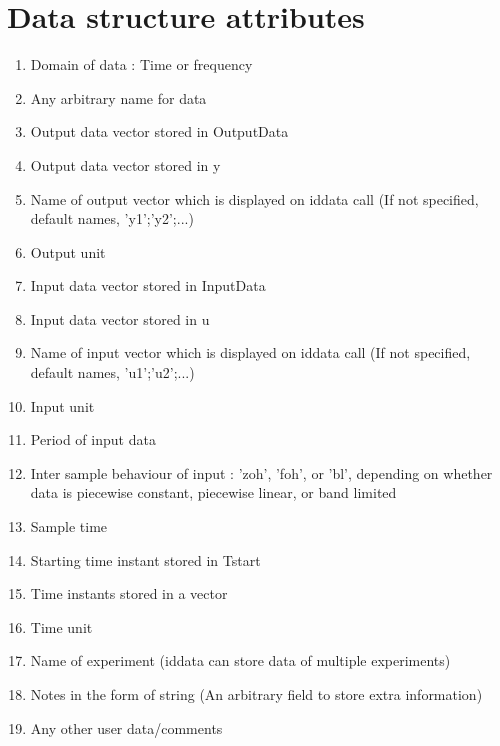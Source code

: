 \documentclass[a4paper,12pt]{report}
\begin{document}
	\section{Data structure attributes}
			
			
			
			\begin{enumerate}
			
			\item Domain of data : Time or frequency	
			\item Any arbitrary name for data 
				
			\item Output data vector stored in OutputData
			
			\item Output data vector stored in y
				
				\item Name of output vector which is displayed on iddata call (If not specified, default names, {'y1';'y2';...})
				
				 \item Output unit
				 	\item Input data vector stored in InputData
				 
				 \item Input data vector stored in u
				 
				 \item Name of input vector which is displayed on iddata call (If not specified, default names, {'u1';'u2';...})
				 
				 \item Input unit
			
				
				\item Period of input data 
			
			\item Inter sample behaviour of input : 'zoh', 'foh', or 'bl', depending on whether data is piecewise constant, piecewise linear, or band limited
				
			\item Sample time
				
			\item Starting time instant stored in Tstart
				
				\item Time instants stored in a vector
				
			\item Time unit
				
			\item Name of experiment (iddata can store data of multiple experiments)
				
		\item Notes in the form of string (An arbitrary field to store extra information)
				
			\item Any other user data/comments
			\end{enumerate}
			
\end{document}
